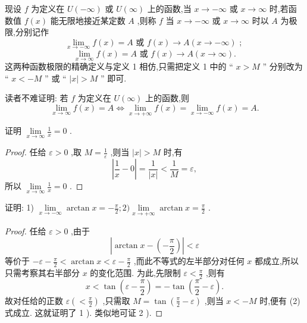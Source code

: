 现设 \(f\) 为定义在 \(U\left( {-\infty }\right)\) 或 \(U\left( \infty \right)\) 上的函数,当 \(x \rightarrow   - \infty\) 或 \(x \rightarrow  \infty\) 时,若函数值 \(f\left( x\right)\) 能无限地接近某定数 \(A\) ,则称 \(f\) 当 \(x \rightarrow   - \infty\) 或 \(x \rightarrow  \infty\) 时以 \(A\) 为极限,分别记作
\[
\mathop{\lim }\limits_{{x \rightarrow   - \infty }}f\left( x\right)  = A\text{ 或 }f\left( x\right)  \rightarrow  A\left( {x \rightarrow   - \infty }\right) \text{ ; }
\]
\[
\mathop{\lim }\limits_{{x \rightarrow  \infty }}f\left( x\right)  = A\text{ 或 }f\left( x\right)  \rightarrow  A\left( {x \rightarrow  \infty }\right) .
\]
这两种函数极限的精确定义与定义 1 相仿,只需把定义 1 中的 “ \(x > M\) ” 分别改为 “ \(x <  - M\) ” 或 “ \(\left| x\right|  > M\) ” 即可.

读者不难证明: 若 \(f\) 为定义在 \(U\left( \infty \right)\) 上的函数,则
\[
\mathop{\lim }\limits_{{x \rightarrow  \infty }}f\left( x\right)  = A \Leftrightarrow  \mathop{\lim }\limits_{{x \rightarrow   + \infty }}f\left( x\right)  = \mathop{\lim }\limits_{{x \rightarrow   - \infty }}f\left( x\right)  = A. \tag{1}
\]
\begin{example}
证明 \(\mathop{\lim }\limits_{{x \rightarrow  \infty }}\frac{1}{x} = 0\) .
\end{example}


\begin{proof}
任给 \(\varepsilon  > 0\) ,取 \(M = \frac{1}{\varepsilon }\) ,则当 \(\left| x\right|  > M\) 时,有
\[
\left| {\frac{1}{x} - 0}\right|  = \frac{1}{\left| x\right| } < \frac{1}{M} = \varepsilon ,
\]
所以 \(\mathop{\lim }\limits_{{x \rightarrow  \infty }}\frac{1}{x} = 0\) .
\end{proof}


\begin{example}
证明: 1) \(\mathop{\lim }\limits_{{x \rightarrow   - \infty }}\arctan x =  - \frac{\pi }{2};2)\mathop{\lim }\limits_{{x \rightarrow   + \infty }}\arctan x = \frac{\pi }{2}\) .
\end{example}

\begin{proof}
任给 \(\varepsilon  > 0\) ,由于
\[
\left| {\arctan x - \left( {-\frac{\pi }{2}}\right) }\right|  < \varepsilon  \tag{2}
\]
等价于 \(- \varepsilon  - \frac{\pi }{2} < \arctan x < \varepsilon  - \frac{\pi }{2}\) ,而此不等式的左半部分对任何 \(x\) 都成立,所以只需考察其右半部分 \(x\) 的变化范围. 为此,先限制 \(\varepsilon  < \frac{\pi }{2}\) ,则有
\[
x < \tan \left( {\varepsilon  - \frac{\pi }{2}}\right)  =  - \tan \left( {\frac{\pi }{2} - \varepsilon }\right) .
\]
故对任给的正数 \(\varepsilon \left( { < \frac{\pi }{2}}\right)\) ,只需取 \(M = \tan \left( {\frac{\pi }{2} - \varepsilon }\right)\) ,则当 \(x <  - M\) 时,便有 (2) 式成立. 这就证明了 1 ). 类似地可证 2 ).
\end{proof}


